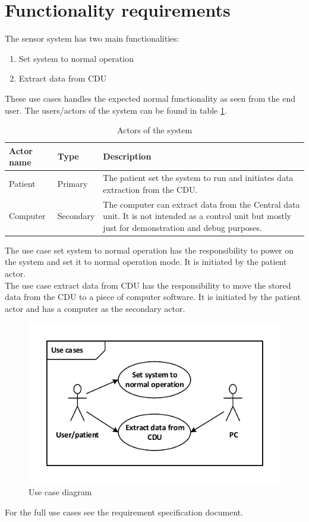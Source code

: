 \section{Functionality requirements}
The sensor system has two main functionalities:
\begin{enumerate}
	\item Set system to normal operation
	\item Extract data from CDU
\end{enumerate}
These use cases handles the expected normal functionality as seen from the end user. The users/actors of the system can be found in table \ref{tab:actors}.
\begin{table}[H]
	\centering
	\begin{tabular}{|l|l|p{9.5cm}|}
	\hline
	Actor name & Type & Description \\ \hline
	Patient & Primary & The patient set the system to run and initiates data extraction from the CDU. \\ \hline
	Computer & Secondary  & The computer can extract data from the Central data unit. It is not intended as a control unit but mostly just for demonstration and debug purposes.\\ \hline
	\end{tabular}
	\caption{Actors of the system}
	\label{tab:actors}
\end{table}
The use case set system to normal operation has the responsibility to power on the system and set it to normal operation mode. It is initiated by the patient actor.\\
The use case extract data from CDU has the responsibility to move the stored data from the CDU to a piece of computer software. It is initiated by the patient actor and has a computer as the secondary actor. 
\begin{figure}[H]
	\centering
	\includegraphics[width=.7\textwidth]{billeder/7requirementspec/usecase_vector}
	\caption{Use case diagram}
\end{figure}
For the full use cases see the requirement specification document.

